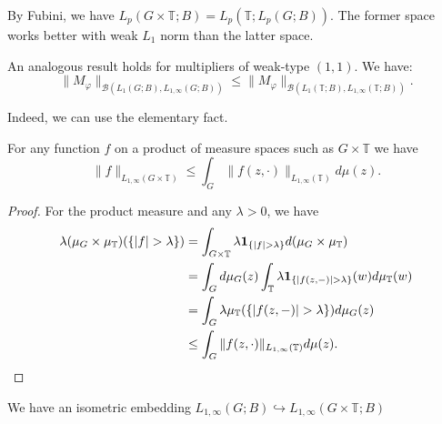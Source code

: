 By Fubini, we have $L_p(G\times\mathbb{T};B)=L_p(\mathbb{T};L_p(G;B))$. The former space works better with weak $L_1$ norm than the latter space.
    \begin{remark}
        An analogous result holds for multipliers of weak-type $(1,1)$. We have:
        \[  \|M_\varphi\|_{\mathcal{B}(L_1(G;B),L_{1,\infty}(G;B))}\leq\|M_\varphi\|_{\mathcal{B}(L_1(\mathbb{T};B),L_{1,\infty}(\mathbb{T};B))}.\]
    \end{remark}
    Indeed, we can use the elementary fact.
    \begin{lemma}
        For any function $f$ on a product of measure spaces such as $G\times\mathbb{T}$ we have
        \[  \|f\|_{L_{1,\infty}(G\times\mathbb{T})}\leq\int_{G}\|f(z,\cdot)\|_{L_{1,\infty}(\mathbb{T})}d\mu(z).     \]
    \end{lemma}
    \begin{proof}
        For the product measure and any $\lambda>0$, we have
        \begin{align*}
            \lambda(\mu_{G}\times\mu_{\mathbb{T}})(\{|f|>\lambda\})
              &=\int_{G\times\mathbb{T}}\lambda\mathbf{1}_{\{|f|>\lambda\}}d(\mu_G\times\mu_{\mathbb{T}})
            \\&=\int_{G}d\mu_G(z)\int_{\mathbb{T}}\lambda\mathbf{1}_{\{|f(z,-)|>\lambda\}}(w)d\mu_{\mathbb{T}}(w)
            \\&= \int_{G}\lambda\mu_{\mathbb{T}}({\{|f(z,-)|>\lambda\}})d\mu_G(z)
            \\&\leq \int_{G}\|f(z,\cdot)\|_{L_{1,\infty}(\mathbb{T})}d\mu(z).\qedhere
        \end{align*}
    \end{proof}
    \begin{lemma}
        We have an isometric embedding $L_{1,\infty}(G;B)\hookrightarrow L_{1,\infty}(G\times\mathbb{T};B)$
    \end{lemma}
